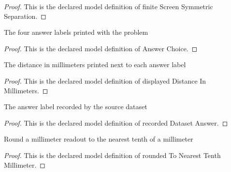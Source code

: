 \begin{proof}
  This is the declared model definition of finite Screen Symmetric Separation.
\end{proof}
\begin{definition}
  \label{def:physics:phyx-mini-0248:phyxminiproblems-problemphyxmini0248-answerchoice}
  The four answer labels printed with the problem
\end{definition}
\begin{proof}
  This is the declared model definition of Answer Choice.
\end{proof}
\begin{definition}
  \label{def:physics:phyx-mini-0248:phyxminiproblems-problemphyxmini0248-displayeddistanceinmillimeters}
  The distance in millimeters printed next to each answer label
\end{definition}
\begin{proof}
  This is the declared model definition of displayed Distance In Millimeters.
\end{proof}
\begin{definition}
  \label{def:physics:phyx-mini-0248:phyxminiproblems-problemphyxmini0248-recordeddatasetanswer}
  The answer label recorded by the source dataset
\end{definition}
\begin{proof}
  This is the declared model definition of recorded Dataset Answer.
\end{proof}
\begin{definition}
  \label{def:physics:phyx-mini-0248:phyxminiproblems-problemphyxmini0248-roundedtonearesttenthmillimeter}
  Round a millimeter readout to the nearest tenth of a millimeter
\end{definition}
\begin{proof}
  This is the declared model definition of rounded To Nearest Tenth Millimeter.
\end{proof}
